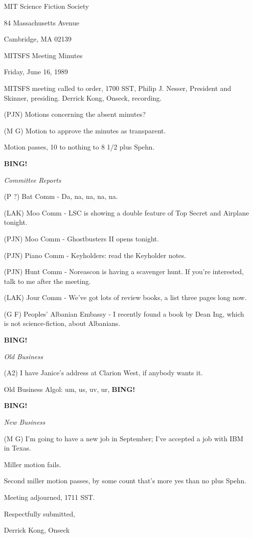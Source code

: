 \documentclass[12pt]{article}
\newcommand{\bing}{{\bf BING!} }
\newcommand{\goto}[1]{\bing \vskip 12pt \centerline{{\em{#1}}}}
\begin{document}
\begin{center}

MIT Science Fiction Society 

84 Massachusetts Avenue

Cambridge, MA 02139

\vspace{12pt}

MITSFS Meeting Minutes 

Friday, June 16, 1989

\end{center}
 
\vspace{18pt}

\setlength{\parskip}{6pt}

\noindent
MITSFS meeting called to order, 1700 SST, Philip J. Nesser, President and Skinner, presiding. Derrick Kong, Onseck, recording.

(PJN) Motions concerning the absent minutes?

(M G) Motion to approve the minutes as transparent.

Motion passes, 10 to nothing to 8 1/2 plus Spehn.

\goto{Committee Reports}

(P ?) Bat Comm - Da, na, na, na, na.

(LAK) Moo Comm - LSC is showing a double feature of Top Secret and Airplane tonight.

(PJN) Moo Comm - Ghostbusters II opens tonight.

(PJN) Piano Comm - Keyholders: read the Keyholder notes.

(PJN) Hunt Comm - Noreascon is having a scavenger hunt. If you're interested, talk to me after the meeting.

(LAK) Jour Comm - We've got lots of review books, a list three pages long now.

(G F) Peoples' Albanian Embassy - I recently found a book by Dean Ing, which is not science-fiction, about Albanians.

\goto{Old Business}

(A2) I have Janice's address at Clarion West, if anybody wants it.

Old Business Algol: um, us, uv, ur, \bing

\goto{New Business}

(M G) I'm going to have a new job in September; I've accepted a job with IBM in Texas.

Miller motion fails.

Second miller motion passes, by some count that's more yes than no plus Spehn.

\vspace{12pt}

\noindent
Meeting adjourned, 1711 SST.

\vspace{18pt}

\centerline{Respectfully submitted,}
\centerline{Derrick Kong, Onseck}
\end{document}
